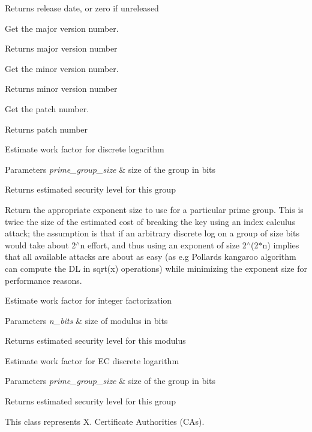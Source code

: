 \begin{DoxyReturn}{Returns}
release date, or zero if unreleased
\end{DoxyReturn}
Get the major version number. \begin{DoxyReturn}{Returns}
major version number
\end{DoxyReturn}
Get the minor version number. \begin{DoxyReturn}{Returns}
minor version number
\end{DoxyReturn}
Get the patch number. \begin{DoxyReturn}{Returns}
patch number
\end{DoxyReturn}
Estimate work factor for discrete logarithm 
\begin{DoxyParams}{Parameters}
{\em prime\+\_\+group\+\_\+size} & size of the group in bits \\
\hline
\end{DoxyParams}
\begin{DoxyReturn}{Returns}
estimated security level for this group
\end{DoxyReturn}
Return the appropriate exponent size to use for a particular prime group. This is twice the size of the estimated cost of breaking the key using an index calculus attack; the assumption is that if an arbitrary discrete log on a group of size bits would take about 2$^\wedge$n effort, and thus using an exponent of size 2$^\wedge$(2$\ast$n) implies that all available attacks are about as easy (as e.\+g Pollard\textquotesingle{}s kangaroo algorithm can compute the DL in sqrt(x) operations) while minimizing the exponent size for performance reasons.

Estimate work factor for integer factorization 
\begin{DoxyParams}{Parameters}
{\em n\+\_\+bits} & size of modulus in bits \\
\hline
\end{DoxyParams}
\begin{DoxyReturn}{Returns}
estimated security level for this modulus
\end{DoxyReturn}
Estimate work factor for EC discrete logarithm 
\begin{DoxyParams}{Parameters}
{\em prime\+\_\+group\+\_\+size} & size of the group in bits \\
\hline
\end{DoxyParams}
\begin{DoxyReturn}{Returns}
estimated security level for this group
\end{DoxyReturn}
This class represents X. Certificate Authorities (C\+As).

